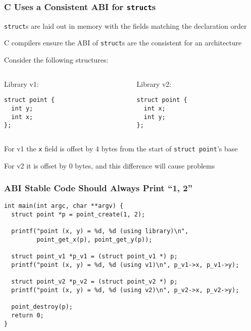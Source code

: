   \begin{frame}[fragile]
    \frametitle{C Uses a Consistent ABI for \texttt{struct}s}

    \texttt{struct}s are laid out in memory with the fields matching the
    declaration order

    \hspace{2em} C compilers ensure the ABI of \texttt{struct}s are the
    consistent for an architecture

    \vspace{2em}

    Consider the following structures:

    \vspace{1em}

    \begin{columns}
      \begin{column}{0.4\textwidth}
        Library v1:
        \begin{lstlisting}[basicstyle=\small\ttfamily]
struct point {
  int y;
  int x;
};
        \end{lstlisting}
      \end{column}
      \begin{column}{0.4\textwidth}
        Library v2:
        \begin{lstlisting}[basicstyle=\small\ttfamily]
struct point {
  int x;
  int y;
};
        \end{lstlisting}
      \end{column}
    \end{columns}

    \vspace{1em}

    For v1 the \texttt{x} field is offset by 4 bytes from the start of
    \texttt{struct point}'s base

    \hspace{2em} For v2 it is offset by 0 bytes, and this difference
    will cause problems
  \end{frame}

  \begin{frame}[fragile]
    \frametitle{ABI Stable Code Should Always Print ``1, 2''}

    \begin{lstlisting}[basicstyle=\small\ttfamily]
int main(int argc, char **argv) {
  struct point *p = point_create(1, 2);

  printf("point (x, y) = %d, %d (using library)\n",
         point_get_x(p), point_get_y(p));

  struct point_v1 *p_v1 = (struct point_v1 *) p;
  printf("point (x, y) = %d, %d (using v1)\n", p_v1->x, p_v1->y);

  struct point_v2 *p_v2 = (struct point_v2 *) p;
  printf("point (x, y) = %d, %d (using v2)\n", p_v2->x, p_v2->y);

  point_destroy(p);
  return 0;
}
    \end{lstlisting}

  \end{frame}

